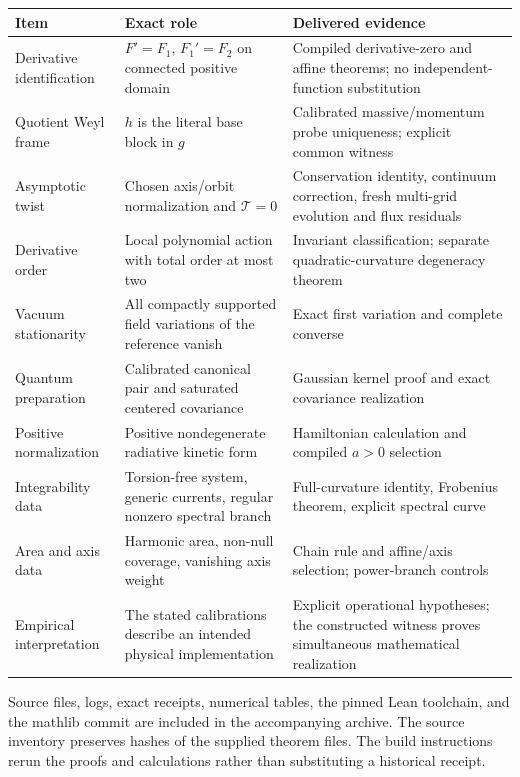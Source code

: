 \documentclass[11pt]{article}
\begin{document}


\begin{longtable}{@{}>{\raggedright\arraybackslash}p{}>{\raggedright\arraybackslash}p{}>{\raggedright\arraybackslash}p{}@{}}
\toprule
Item & Exact role & Delivered evidence \\
\midrule\endhead
Derivative identification & $F'=F_1$, $F_1'=F_2$ on connected positive domain & Compiled derivative-zero and affine theorems; no independent-function substitution \\
Quotient Weyl frame & $h$ is the literal base block in $g$ & Calibrated massive/momentum probe uniqueness; explicit common witness \\
Asymptotic twist & Chosen axis/orbit normalization and $\mathcal T=0$ & Conservation identity, continuum correction, fresh multi-grid evolution and flux residuals \\
Derivative order & Local polynomial action with total order at most two & Invariant classification; separate quadratic-curvature degeneracy theorem \\
Vacuum stationarity & All compactly supported field variations of the reference vanish & Exact first variation and complete converse \\
Quantum preparation & Calibrated canonical pair and saturated centered covariance & Gaussian kernel proof and exact covariance realization \\
Positive normalization & Positive nondegenerate radiative kinetic form & Hamiltonian calculation and compiled $a>0$ selection \\
Integrability data & Torsion-free system, generic currents, regular nonzero spectral branch & Full-curvature identity, Frobenius theorem, explicit spectral curve \\
Area and axis data & Harmonic area, non-null coverage, vanishing axis weight & Chain rule and affine/axis selection; power-branch controls \\
Empirical interpretation & The stated calibrations describe an intended physical implementation & Explicit operational hypotheses; the constructed witness proves simultaneous mathematical realization \\
\bottomrule
\end{longtable}

Source files, logs, exact receipts, numerical tables, the pinned Lean toolchain, and the mathlib commit are included in the accompanying archive. The source inventory preserves hashes of the supplied theorem files. The build instructions rerun the proofs and calculations rather than substituting a historical receipt.
\end{document}
